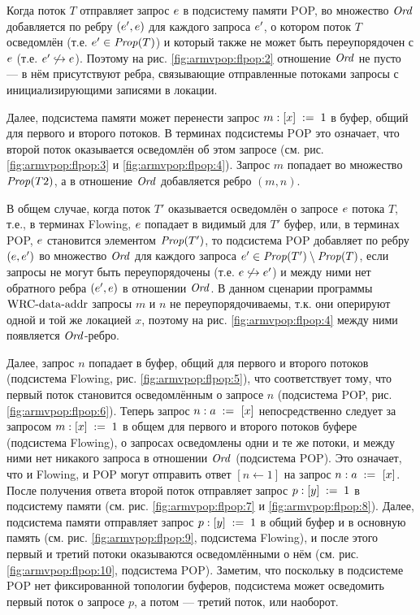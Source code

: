 Когда поток $T$ отправляет запрос $e$ в подсистему памяти POP,
во множество $\mathit{Ord}$ добавляется по ребру $(e', e)$
для каждого запроса $e'$, о котором поток $T$ осведомлён (т.е. $e' \in \mathit{Prop}(T)$)
и который также не может быть переупорядочен с $e$ (т.е. $e' \not \hookrightarrow e$).
Поэтому на рис. \ref{fig:armvpop:flpop:2} отношение $\mathit{Ord}$ не пусто ---
в нём присутствуют ребра, связывающие отправленные потоками запросы
с инициализирующими записями в локации.

Далее, подсистема памяти может перенести запрос $m: [x]\;:=\;1$ в буфер, общий
для первого и второго потоков. В терминах подсистемы POP это означает,
что второй поток оказывается осведомлён об этом запросе
(см. рис. \ref{fig:armvpop:flpop:3} и \ref{fig:armvpop:flpop:4}).
Запрос $m$ попадает во множество $\mathit{Prop}(T2)$, а в отношение $\mathit{Ord}$ добавляется
ребро $(m, n)$.

В общем случае, когда поток $T'$ оказывается осведомлён о запросе $e$ потока $T$,
т.е., в терминах Flowing, $e$ попадает в видимый для $T'$ буфер,
или, в терминах POP, $e$ становится элементом $\mathit{Prop}(T')$, то
подсистема POP добавляет по ребру $(e, e')$ во множество $\mathit{Ord}$
для каждого запроса $e' \in \mathit{Prop}(T') \setminus \mathit{Prop}(T)$, если
запросы не могут быть переупорядочены (т.е. $e \not \hookrightarrow e'$)
и между ними нет обратного ребра $(e', e)$ в отношении $\mathit{Ord}$.
В данном сценарии программы ${\rm WRC\text{-}data\text{-}addr}$
запросы $m$ и $n$ не переупорядочиваемы, т.к. они оперируют одной и той же локацией $x$,
поэтому на рис. \ref{fig:armvpop:flpop:4} между ними появляется $\mathit{Ord}$-ребро.

Далее, запрос $n$ попадает в буфер, общий для первого и второго потоков 
(подсистема Flowing, рис. \ref{fig:armvpop:flpop:5}), что
соответствует тому, что первый поток становится осведомлённым о запросе $n$
(подсистема POP, рис. \ref{fig:armvpop:flpop:6}).
Теперь запрос $n : a \;:=_{}\;[x]$ непосредственно следует за запросом $m : [x]\;:=\;1$
в общем для первого и второго потоков буфере (подсистема Flowing),
о запросах осведомлены одни и те же потоки, и между ними нет никакого запроса в отношении $\mathit{Ord}$
(подсистема POP).
Это означает, что и Flowing, и POP могут отправить ответ $[n \leftarrow 1]$ на запрос $n: a \;:=_{}\;[x]$.
После получения ответа второй поток отправляет запрос $p: [y]\;:=\;1$ в подсистему памяти
(см. рис. \ref{fig:armvpop:flpop:7} и \ref{fig:armvpop:flpop:8}).
Далее, подсистема памяти отправляет запрос $p: [y]\;:=\;1$ в общий буфер и в основную память
(см. рис. \ref{fig:armvpop:flpop:9}, подсистема Flowing), и после этого первый и третий потоки
оказываются осведомлёнными о нём
(см. рис. \ref{fig:armvpop:flpop:10}, подсистема POP).
Заметим, что поскольку в подсистеме POP нет фиксированной топологии буферов, подсистема может
осведомить первый поток о запросе $p$, а потом --- третий поток, или наоборот.

